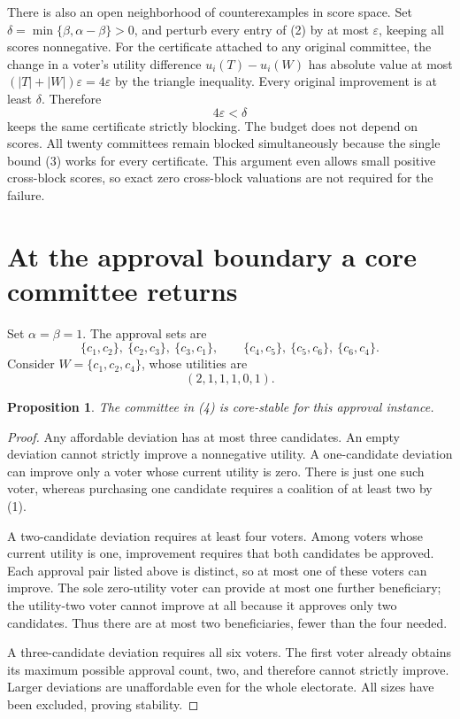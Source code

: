 \documentclass[11pt]{article}
\newtheorem{proposition}{Proposition}
\begin{document}
There is also an open neighborhood of counterexamples in score space.
Set $\delta=\min\{\beta,\alpha-\beta\}>0$, and perturb every entry of
(2) by at most $\varepsilon$, keeping all scores nonnegative. For the
certificate attached to any original committee, the change in a voter's
utility difference $u_i(T)-u_i(W)$ has absolute value at most
$(|T|+|W|)\varepsilon=4\varepsilon$ by the triangle inequality.
Every original improvement is at least $\delta$. Therefore
\[
                            4\varepsilon<\delta                 \tag{3}
\]
keeps the same certificate strictly blocking. The budget does not depend
on scores. All twenty committees remain blocked simultaneously because
the single bound (3) works for every certificate. This argument even
allows small positive cross-block scores, so exact zero cross-block
valuations are not required for the failure.

\section*{At the approval boundary a core committee returns}
Set $\alpha=\beta=1$. The approval sets are
\[
 \{c_1,c_2\},\ \{c_2,c_3\},\ \{c_3,c_1\},\qquad
 \{c_4,c_5\},\ \{c_5,c_6\},\ \{c_6,c_4\}.
\]
Consider $W=\{c_1,c_2,c_4\}$, whose utilities are
\[
                             (2,1,1,1,0,1).                     \tag{4}
\]
\begin{proposition}
The committee in (4) is core-stable for this approval instance.
\end{proposition}
\begin{proof}
Any affordable deviation has at most three candidates. An empty deviation
cannot strictly improve a nonnegative utility. A one-candidate deviation
can improve only a voter whose current utility is zero. There is just one
such voter, whereas purchasing one candidate requires a coalition of at
least two by (1).

A two-candidate deviation requires at least four voters. Among voters
whose current utility is one, improvement requires that both candidates
be approved. Each approval pair listed above is distinct, so at most one
of these voters can improve. The sole zero-utility voter can provide at
most one further beneficiary; the utility-two voter cannot improve at
all because it approves only two candidates. Thus there are at most two
beneficiaries, fewer than the four needed.

A three-candidate deviation requires all six voters. The first voter
already obtains its maximum possible approval count, two, and therefore
cannot strictly improve. Larger deviations are unaffordable even for the
whole electorate. All sizes have been excluded, proving stability.
\end{proof}
\end{document}
